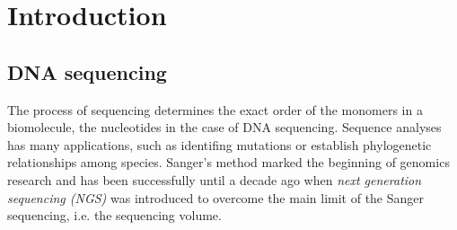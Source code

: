 
\chapter{Introduction} %

\label{Chapter2} %






\section{DNA sequencing}




The process of sequencing determines the exact order of the monomers in a biomolecule, the nucleotides in the case of DNA sequencing. Sequence analyses has many applications, such as identifing mutations or establish phylogenetic relationships among species. Sanger's method marked the beginning of genomics research and has been successfully until a decade ago when \textit{next generation sequencing (NGS)} was introduced to overcome the main limit of the Sanger sequencing,\cite{Sanger5463} i.e. the sequencing volume.

